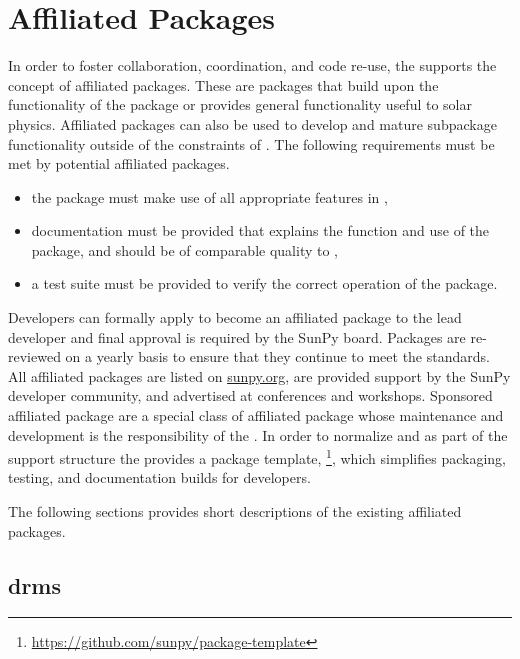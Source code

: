 \section{Affiliated Packages}
\label{sec:affil_package}

In order to foster collaboration, coordination, and code re-use, the \sunpyproj supports the concept of affiliated packages.
These are \python packages that build upon the functionality of the \sunpypkg package or provides general functionality useful to solar physics.
Affiliated packages can also be used to develop and mature subpackage functionality outside of the constraints of \sunpypkg.
The following requirements must be met by potential affiliated packages.
\begin{itemize}
    \item the package must make use of all appropriate features in \sunpypkg, 
    \item documentation must be provided that explains the function and use of the package, and should be of comparable quality to \sunpypkg,
    \item a test suite must be provided to verify the correct operation of the package.
\end{itemize}
Developers can formally apply to become an affiliated package to the lead developer and final approval is required by the SunPy board.
Packages are re-reviewed on a yearly basis to ensure that they continue to meet the standards.
All affiliated packages are listed on \url{sunpy.org}, are provided support by the SunPy developer community, and advertised at conferences and workshops.
Sponsored affiliated package are a special class of affiliated package whose maintenance and development is the responsibility of the \sunpyproj.
In order to normalize and as part of the support structure the \sunpyproj provides a package template, \footnote{\url{https://github.com/sunpy/package-template}}, which simplifies packaging, testing, and documentation builds for developers. 

The following sections provides short descriptions of the existing affiliated packages.

\subsection{drms}
\label{sec:drms}

